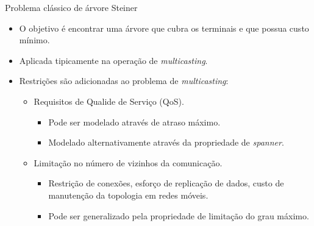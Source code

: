\documentclass[10pt]{beamer}
\begin{document}
\begin{frame}{Problema clássico de árvore Steiner}
  \begin{itemize}
  \item O objetivo é encontrar uma árvore que cubra os terminais e que possua custo mínimo.

  \item Aplicada tipicamente na operação de \emph{multicasting}.
  \item Restrições são adicionadas ao problema de \emph{multicasting}:
  \begin{itemize}
    \item Requisitos de Qualide de Serviço (QoS).
    \begin{itemize}
      \item Pode ser modelado através de atraso máximo.
      \item Modelado alternativamente através da propriedade de \emph{spanner}.
    \end{itemize}
    \item Limitação no número de vizinhos da comunicação.
    \begin{itemize}
      \item Restrição de conexões, esforço de replicação de dados, custo de manutenção da topologia em redes móveis.
      \item Pode ser generalizado pela propriedade de limitação do grau máximo.
    \end{itemize}
  \end{itemize}
  \end{itemize}
\end{frame}
\end{document}
